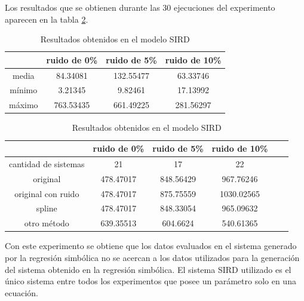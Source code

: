 Los resultados que se obtienen durante las 30 ejecuciones del experimento aparecen en la tabla \ref{table:experiment_SIRD}.

\begin{table}[!h]
    \centering
    \caption{Resultados obtenidos en el modelo SIRD}
    \begin{tabular}{|c|c|c|c|}
        \hline
               & \textbf{ruido de 0\%} & \textbf{ruido de 5\%} & \textbf{ruido de 10\%} \\
        \hline
        media  & 84.34081              & 132.55477             & 63.33746               \\
        \hline
        mínimo & 3.21345               & 9.82461               & 17.13992               \\
        \hline
        máximo & 763.53435             & 661.49225             & 281.56297              \\
        \hline
    \end{tabular}

    \begin{tabular}{|c|c|c|c|c|c|}
        \hline
                             & \textbf{ruido de 0\%} & \textbf{ruido de 5\%} & \textbf{ruido de 10\%} \\
        \hline
        cantidad de sistemas & 21                    & 17                    & 22                     \\
        \hline
        original             & 478.47017             & 848.56429             & 967.76246              \\
        \hline
        original con ruido   & 478.47017             & 875.75559             & 1030.02565             \\
        \hline
        spline               & 478.47017             & 848.33054             & 965.09632              \\
        \hline
        otro método          & 639.35513             & 604.6624              & 540.61365              \\
        \hline
    \end{tabular}
    \label{table:experiment_SIRD}
\end{table}

Con este experimento se obtiene que los datos evaluados en el sistema generado por la regresión simbólica no se acercan a los datos utilizados para la generación del sistema obtenido en la regresión simbólica. El sistema SIRD utilizado es el único sistema entre todos los experimentos que posee un parámetro solo en una ecuación.

